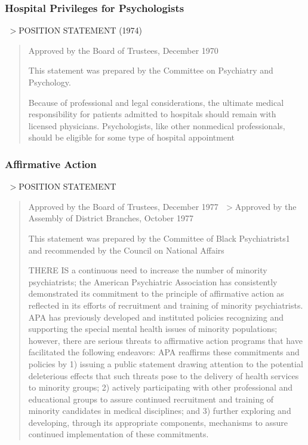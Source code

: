 \subsubsection{Hospital Privileges for Psychologists}
\label{hospitalprivilegesforpsychologists}

 $>$POSITION STATEMENT (1974)

\begin{quote}

Approved by the Board of Trustees, December 1970

This statement was prepared by the Committee on Psychiatry and Psychology.

Because of professional and legal considerations, the ultimate medical responsibility for patients admitted to hospitals should remain with licensed physicians. Psychologists, like other nonmedical professionals, should be eligible for some type of hospital appointment
\end{quote}

\subsubsection{Affirmative Action}
\label{affirmativeaction}

 $>$POSITION STATEMENT

\begin{quote}

Approved by the Board of Trustees, December 1977
 $>$Approved by the Assembly of District Branches, October 1977

This statement was prepared by the Committee of Black Psychiatrists1 and recommended by the Council on National Affairs 

THERE IS a continuous need to increase the number of minority psychiatrists; the American Psychiatric Association has consistently demonstrated its commitment to the principle of affirmative action as reflected in its efforts of recruitment and training of minority psychiatrists. APA has previously developed and instituted policies recognizing and supporting the special mental health issues of minority populations; however, there are serious threats to affirmative action programs that have facilitated the following endeavors: APA reaffirms these commitments and policies by 1) issuing a public statement drawing attention to the potential deleterious effects that such threats pose to the delivery of health services to minority groups; 2) actively participating with other professional and educational groups to assure continued recruitment and training of minority candidates in medical disciplines; and 3) further exploring and developing, through its appropriate components, mechanisms to assure continued implementation of these commitments. 
\end{quote}

